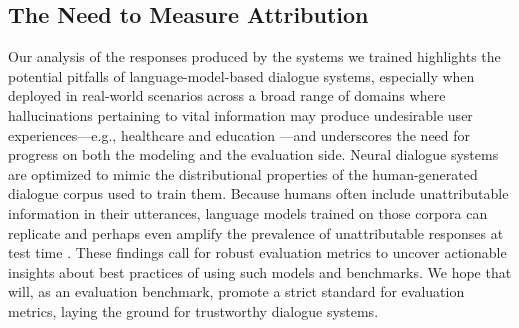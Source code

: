 \subsection{The Need to Measure Attribution}
Our analysis of the responses produced by the systems we trained highlights the potential pitfalls of language-model-based dialogue systems, especially when deployed in real-world scenarios across a broad range of domains where hallucinations pertaining to vital information may produce undesirable user experiences---e.g., healthcare \cite{laranjo2018conversational, jovanovic2020chatbots} and education  \cite{yang2019opportunities, kochmar2021automated}---and underscores the need for progress on both the modeling and the evaluation side.
Neural dialogue systems are optimized to mimic the distributional properties of the human-generated dialogue corpus used to train them. Because humans often include unattributable information in their utterances, language models trained on those corpora can replicate and perhaps even amplify the prevalence of unattributable responses at test time \cite{kang-hashimoto-2020-improved, dziri2022origin}. These findings call for robust evaluation metrics to uncover actionable insights about best practices of using such models and benchmarks.
We hope that \BEGIN{} will, as an evaluation benchmark, promote a strict standard for evaluation metrics, laying the ground for trustworthy dialogue systems.


 
















